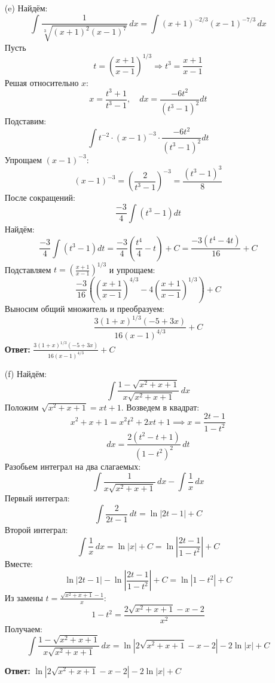 \documentclass[a4paper]{article}
\begin{document}
\begin{enumerate}
\begin{enumerate}
    \item[(e)]Найдём:
    $$\int \frac{1}{\sqrt[3]{(x+1)^2(x-1)^7}} \, dx = \int (x+1)^{-2/3} (x-1)^{-7/3} \, dx$$
    Пусть
    \[
    t = \left(\frac{x+1}{x-1}\right)^{1/3} \Rightarrow t^3 = \frac{x+1}{x-1}
    \]
    Решая относительно \(x\):
    \[
    x = \frac{t^3 + 1}{t^3 - 1}, \quad dx = \frac{-6t^2}{(t^3 - 1)^2} dt
    \]
    Подставим:
    \[
    \int t^{-2} \cdot (x-1)^{-3} \cdot \frac{-6t^2}{(t^3 - 1)^2} dt
    \]
    Упрощаем \((x-1)^{-3}\):
    \[
    (x-1)^{-3} = \left(\frac{2}{t^3 - 1}\right)^{-3} = \frac{(t^3 - 1)^3}{8}
    \]
    После сокращений:
    \[
    \frac{-3}{4} \int (t^3 - 1) dt
    \]
    Найдём:
    \[
        \frac{-3}{4} \int (t^3 - 1) dt = \frac{-3}{4} \left( \frac{t^4}{4} - t \right) + C = \frac{-3(t^4 - 4t)}{16} + C
    \]
    Подставляем \(t = \left(\frac{x+1}{x-1}\right)^{1/3}\) и упрощаем:
    \[
    \frac{-3}{16} \left( \left(\frac{x+1}{x-1}\right)^{4/3} - 4\left(\frac{x+1}{x-1}\right)^{1/3} \right) + C
    \]
    Выносим общий множитель и преобразуем:
    \[
    \frac{3(1 + x)^{1/3}(-5 + 3x)}{16(x - 1)^{4/3}} + C
    \]
    \textbf{Ответ: } $\frac{3(1 + x)^{1/3}(-5 + 3x)}{16(x - 1)^{4/3}} + C$\\

    \item[(f)]Найдём:
    $$\int \frac{1 - \sqrt{x^2 + x + 1}}{x\sqrt{x^2 + x + 1}} \, dx$$
    Положим \(\sqrt{x^2 + x + 1} = x t + 1\).  
    Возведем в квадрат:  
    \[
    x^2 + x + 1 = x^2 t^2 + 2x t + 1 \implies x = \frac{2t - 1}{1 - t^2}
    \]
    \[
    dx = \frac{2(t^2 - t + 1)}{(1 - t^2)^2} \, dt
    \]
    Разобьем интеграл на два слагаемых:  
    \[
    \int \frac{1}{x\sqrt{x^2 + x + 1}} \, dx - \int \frac{1}{x} \, dx
    \]
    Первый интеграл: 
    \[
    \int \frac{2}{2t - 1} \, dt = \ln|2t - 1| + C
    \]
    Второй интеграл:  
    \[  
    \int \frac{1}{x} \, dx = \ln|x| + C = \ln\left|\frac{2t - 1}{1 - t^2}\right| + C
    \]
    Вместе:
    \[
    \ln|2t - 1| - \ln\left|\frac{2t - 1}{1 - t^2}\right| + C = \ln|1 - t^2| + C
    \]
    Из замены \(t = \frac{\sqrt{x^2 + x + 1} - 1}{x}\):  
    \[
    1 - t^2 = \frac{2\sqrt{x^2 + x + 1} - x - 2}{x^2}
    \]
    Получаем:
    \[
    \int \frac{1 - \sqrt{x^2 + x + 1}}{x\sqrt{x^2 + x + 1}} \, dx = \ln|2\sqrt{x^2 + x + 1} - x - 2| - 2\ln|x| + C
    \]

    \textbf{Ответ: } $\ln|2\sqrt{x^2 + x + 1} - x - 2| - 2\ln|x| + C$\\
 
\end{enumerate}


\end{enumerate}
\end{document}
